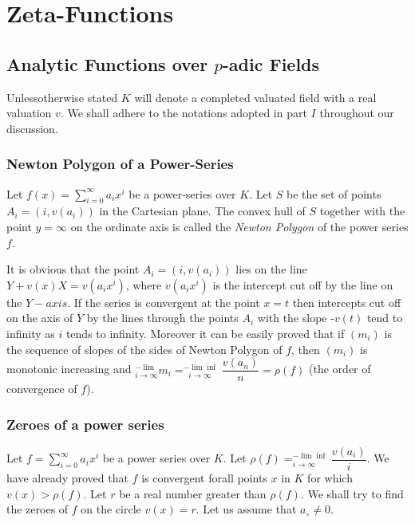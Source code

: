 \part{Zeta-Functions}\label{part3}

\chapter{Analytic Functions over $p$-adic Fields}\label{part3:chap1}

Unless\pageoriginale otherwise stated $K$ will denote a completed valuated field
with a real valuation $v$. We shall adhere to the notations adopted in
part $I$  throughout our discussion. 
 
\section{Newton Polygon of a Power-Series}\label{part3:chap1:sec1}

\begin{defi*}
  Let $f(x)=\sum\limits_{i= 0}^{\infty}a_{i}x^{i}$ be a
  power-series over $K$. Let $S$ be the set of points $A_{i} = (i,
  v(a_{i}))$ in the Cartesian plane. The convex hull of $S$ together
  with the point $y = \infty$ on the ordinate axis is called the
  \textit{Newton Polygon} of the power series $f$. 
\end{defi*}

It is obvious that the point $A_{i} = (i, v(a_{i}))$ lies on the line
$Y + v(x)X = v(a_{i}x^{i})$, where $v(a_{i}x^{i})$ is the intercept
cut off by the line on the $Y-axis$. If the series is convergent at
the point $x = t$ then intercepts cut off on the axis of $Y$ by the
lines through the points $A_{i}$ with the slope -$v(t)$ tend to
infinity as $i$ tends to infinity. Moreover it can be easily proved
that if $(m_{i})$ is the sequence of slopes of the sides of Newton
Polygon of $f$, then $(m_{i})$ is monotonic increasing and
$^{-\lim}_{i\to\infty} m_{i}=^{-\lim\inf}_{~~~i\to\infty}
\dfrac{v(a_{n})}{n}=\rho(f)$ (the order of convergence of $f$). 

\section{Zeroes of a power series}\label{part3:chap1:sec2}

Let $f=\sum\limits^{\infty}_{i=0} a_{i}x^{i}$ be a power series over
$K$.  Let $\rho(f)=^{-\lim\inf}_{i\to\infty} \dfrac{v(a_{i})}{i}$. We
have already proved that $f$  is convergent for\pageoriginale all
points $x$ in $K$ 
for which $v(x)> \rho(f)$. Let $r$ be a  real number greater than
$\rho (f)$. We shall try to find the zeroes of $f$ on the circle
$v(x)=r$. Let us assume that $a_{\circ}\neq 0$. 

